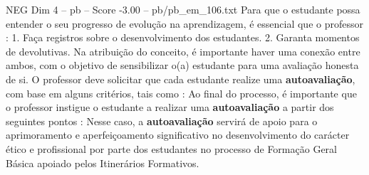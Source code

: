 \begin{textsample}{NEG Dim 4 – pb – Score -3.00 – pb/pb\_em\_106.txt}
Para que o estudante possa entender o seu progresso de evolução na aprendizagem, é essencial que o professor : 1.
Faça registros sobre o desenvolvimento dos estudantes. 2.
Garanta momentos de devolutivas.
Na atribuição do conceito, é importante haver uma conexão entre ambos, com o objetivo de sensibilizar o(a) estudante para uma avaliação honesta de si.
O professor deve solicitar que cada estudante realize uma \textbf{autoavaliação}, com base em alguns critérios, tais como : Ao final do processo, é importante que o professor instigue o estudante a realizar uma \textbf{autoavaliação} a partir dos seguintes pontos : Nesse caso, a \textbf{autoavaliação} servirá de apoio para o aprimoramento e aperfeiçoamento significativo no desenvolvimento do carácter ético e profissional por parte dos estudantes no processo de Formação Geral Básica apoiado pelos Itinerários Formativos.

\end{textsample}
